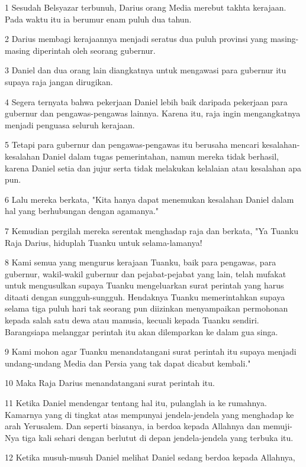 \par 1 Sesudah Belsyazar terbunuh, Darius orang Media merebut takhta kerajaan. Pada waktu itu ia berumur enam puluh dua tahun.
\par 2 Darius membagi kerajaannya menjadi seratus dua puluh provinsi yang masing-masing diperintah oleh seorang gubernur.
\par 3 Daniel dan dua orang lain diangkatnya untuk mengawasi para gubernur itu supaya raja jangan dirugikan.
\par 4 Segera ternyata bahwa pekerjaan Daniel lebih baik daripada pekerjaan para gubernur dan pengawas-pengawas lainnya. Karena itu, raja ingin mengangkatnya menjadi penguasa seluruh kerajaan.
\par 5 Tetapi para gubernur dan pengawas-pengawas itu berusaha mencari kesalahan-kesalahan Daniel dalam tugas pemerintahan, namun mereka tidak berhasil, karena Daniel setia dan jujur serta tidak melakukan kelalaian atau kesalahan apa pun.
\par 6 Lalu mereka berkata, "Kita hanya dapat menemukan kesalahan Daniel dalam hal yang berhubungan dengan agamanya."
\par 7 Kemudian pergilah mereka serentak menghadap raja dan berkata, "Ya Tuanku Raja Darius, hiduplah Tuanku untuk selama-lamanya!
\par 8 Kami semua yang mengurus kerajaan Tuanku, baik para pengawas, para gubernur, wakil-wakil gubernur dan pejabat-pejabat yang lain, telah mufakat untuk mengusulkan supaya Tuanku mengeluarkan surat perintah yang harus ditaati dengan sungguh-sungguh. Hendaknya Tuanku memerintahkan supaya selama tiga puluh hari tak seorang pun diizinkan menyampaikan permohonan kepada salah satu dewa atau manusia, kecuali kepada Tuanku sendiri. Barangsiapa melanggar perintah itu akan dilemparkan ke dalam gua singa.
\par 9 Kami mohon agar Tuanku menandatangani surat perintah itu supaya menjadi undang-undang Media dan Persia yang tak dapat dicabut kembali."
\par 10 Maka Raja Darius menandatangani surat perintah itu.
\par 11 Ketika Daniel mendengar tentang hal itu, pulanglah ia ke rumahnya. Kamarnya yang di tingkat atas mempunyai jendela-jendela yang menghadap ke arah Yerusalem. Dan seperti biasanya, ia berdoa kepada Allahnya dan memuji-Nya tiga kali sehari dengan berlutut di depan jendela-jendela yang terbuka itu.
\par 12 Ketika musuh-musuh Daniel melihat Daniel sedang berdoa kepada Allahnya,

